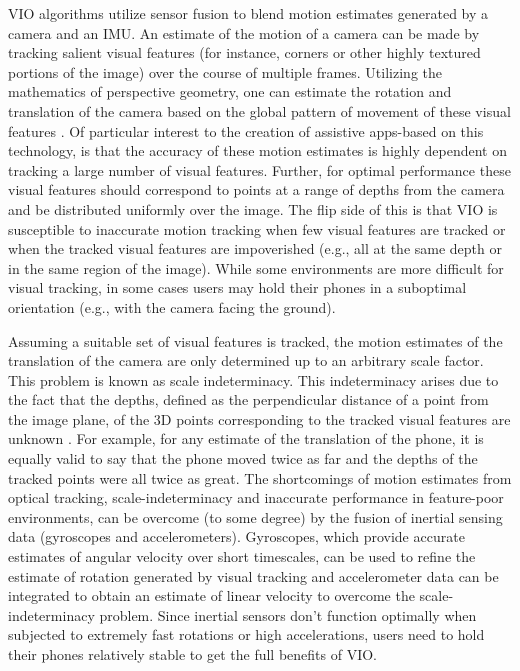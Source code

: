 \documentclass[chi_draft]{sigchi}
\begin{document}
VIO algorithms utilize sensor fusion to blend motion estimates generated by a camera and an IMU.  An estimate of the motion of a camera can be made by tracking salient visual features (for instance, corners or other highly textured portions of the image) over the course of multiple frames.  Utilizing the mathematics of perspective geometry, one can estimate the rotation and translation of the camera based on the global pattern of movement of these visual features \cite{Hartley2004}.  Of particular interest to the creation of assistive apps-based on this technology, is that the accuracy of these motion estimates is highly dependent on tracking a large number of visual features.  Further, for optimal performance these visual features should correspond to points at a range of depths from the camera and be distributed uniformly over the image.  The flip side of this is that VIO is susceptible to inaccurate motion tracking when few visual features are tracked or when the tracked visual features are impoverished (e.g., all at the same depth or in the same region of the image).  While some environments are more difficult for visual tracking, in some cases users may hold their phones in a suboptimal orientation (e.g., with the camera facing the ground).

Assuming a suitable set of visual features is tracked, the motion estimates of the translation of the camera are only determined up to an arbitrary scale factor.  This problem is known as scale indeterminacy.  This indeterminacy arises due to the fact that the depths, defined as the perpendicular distance of a point from the image plane, of the 3D points corresponding to the tracked visual features are unknown \cite{Hartley2004}.  For example, for any estimate of the translation of the phone, it is equally valid to say that the phone moved twice as far and the depths of the tracked points were all twice as great.  The shortcomings of motion estimates from optical tracking, scale-indeterminacy and inaccurate performance in feature-poor environments, can be overcome (to some degree) by the fusion of inertial sensing data (gyroscopes and accelerometers).  Gyroscopes, which provide accurate estimates of angular velocity over short timescales, can be used to refine the estimate of rotation generated by visual tracking and accelerometer data can be integrated to obtain an estimate of linear velocity to overcome the scale-indeterminacy problem.  Since inertial sensors don't function optimally when subjected to extremely fast rotations or high accelerations, users need to hold their phones relatively stable to get the full benefits of VIO.
\end{document}
